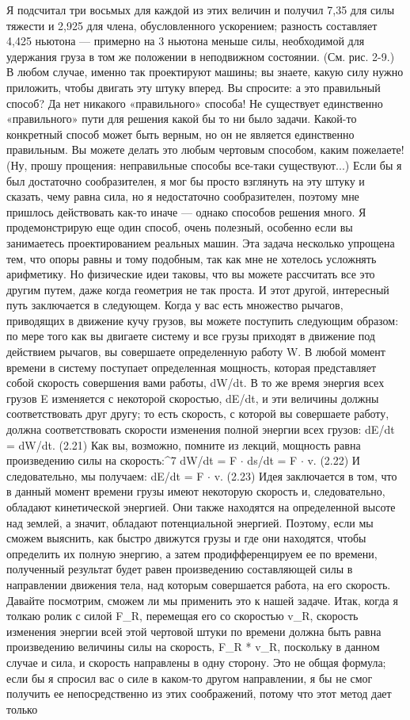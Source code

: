 \documentclass[10pt,oneside]{article}
\begin{document}
Я подсчитал три восьмых для каждой из этих величин и получил 7,35 для силы тяжести и 2,925 для члена, обусловленного ускорением; разность составляет 4,425 ньютона --- примерно на 3 ньютона меньше силы, необходимой для удержания груза в том же положении в неподвижном состоянии. (См. рис. 2-9.) В любом случае, именно так проектируют машины; вы знаете, какую силу нужно приложить, чтобы двигать эту штуку вперед. Вы спросите: а это правильный способ? Да нет никакого «правильного» способа! Не существует единственно «правильного» пути для решения какой бы то ни было задачи. Какой-то конкретный способ может быть верным, но он не является единственно правильным. Вы можете делать это любым чертовым способом, каким пожелаете! (Ну, прошу прощения: неправильные способы все-таки существуют...) Если бы я был достаточно сообразителен, я мог бы просто взглянуть на эту штуку и сказать, чему равна сила, но я недостаточно сообразителен, поэтому мне пришлось действовать как-то иначе --- однако способов решения много. Я продемонстрирую еще один способ, очень полезный, особенно если вы занимаетесь проектированием реальных машин. Эта задача несколько упрощена тем, что опоры равны и тому подобным, так как мне не хотелось усложнять арифметику. Но физические идеи таковы, что вы можете рассчитать все это другим путем, даже когда геометрия не так проста. И этот другой, интересный путь заключается в следующем. Когда у вас есть множество рычагов, приводящих в движение кучу грузов, вы можете поступить следующим образом: по мере того как вы двигаете систему и все грузы приходят в движение под действием рычагов, вы совершаете определенную работу W. В любой момент времени в систему поступает определенная мощность, которая представляет собой скорость совершения вами работы, dW/dt. В то же время энергия всех грузов E изменяется с некоторой скоростью, dE/dt, и эти величины должны соответствовать друг другу; то есть скорость, с которой вы совершаете работу, должна соответствовать скорости изменения полной энергии всех грузов: dE/dt = dW/dt. (2.21) Как вы, возможно, помните из лекций, мощность равна произведению силы на скорость:\textasciicircum{}7 dW/dt = F \ensuremath{\cdot} ds/dt = F \ensuremath{\cdot} v. (2.22) И следовательно, мы получаем: dE/dt = F \ensuremath{\cdot} v. (2.23) Идея заключается в том, что в данный момент времени грузы имеют некоторую скорость и, следовательно, обладают кинетической энергией. Они также находятся на определенной высоте над землей, а значит, обладают потенциальной энергией. Поэтому, если мы сможем выяснить, как быстро движутся грузы и где они находятся, чтобы определить их полную энергию, а затем продифференцируем ее по времени, полученный результат будет равен произведению составляющей силы в направлении движения тела, над которым совершается работа, на его скорость. Давайте посмотрим, сможем ли мы применить это к нашей задаче. Итак, когда я толкаю ролик с силой F\_R, перемещая его со скоростью v\_R, скорость изменения энергии всей этой чертовой штуки по времени должна быть равна произведению величины силы на скорость, F\_R * v\_R, поскольку в данном случае и сила, и скорость направлены в одну сторону. Это не общая формула; если бы я спросил вас о силе в каком-то другом направлении, я бы не смог получить ее непосредственно из этих соображений, потому что этот метод дает только 
\end{document}
